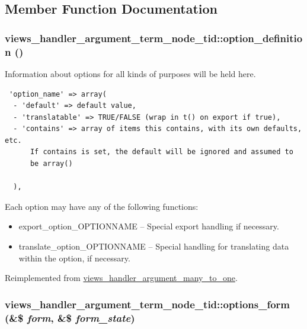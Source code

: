 \subsection{Member Function Documentation}
\hypertarget{classviews__handler__argument__term__node__tid_aa442cbd37f901be13e6db17f61e8d02}{
\subsubsection[{option\_\-definition}]{\setlength{\rightskip}{0pt plus 5cm}views\_\-handler\_\-argument\_\-term\_\-node\_\-tid::option\_\-definition ()}}
\label{classviews__handler__argument__term__node__tid_aa442cbd37f901be13e6db17f61e8d02}


Information about options for all kinds of purposes will be held here. 

\begin{Code}\begin{verbatim} 'option_name' => array(
  - 'default' => default value,
  - 'translatable' => TRUE/FALSE (wrap in t() on export if true),
  - 'contains' => array of items this contains, with its own defaults, etc.
      If contains is set, the default will be ignored and assumed to
      be array()

  ),
\end{verbatim}
\end{Code}

 Each option may have any of the following functions:\begin{itemize}
\item export\_\-option\_\-OPTIONNAME -- Special export handling if necessary.\item translate\_\-option\_\-OPTIONNAME -- Special handling for translating data within the option, if necessary. \end{itemize}


Reimplemented from \hyperlink{classviews__handler__argument__many__to__one_4c28692f87058983cc6a4a4d018d710e}{views\_\-handler\_\-argument\_\-many\_\-to\_\-one}.\hypertarget{classviews__handler__argument__term__node__tid_f00552a1378333434154989c051d0e98}{
\subsubsection[{options\_\-form}]{\setlength{\rightskip}{0pt plus 5cm}views\_\-handler\_\-argument\_\-term\_\-node\_\-tid::options\_\-form (\&\$ {\em form}, \/  \&\$ {\em form\_\-state})}}
\label{classviews__handler__argument__term__node__tid_f00552a1378333434154989c051d0e98}


